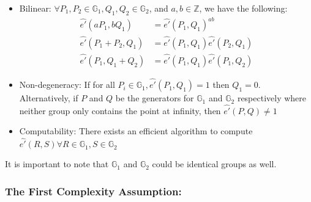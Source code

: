 \begin{itemize}
 \item Bilinear: $\forall P_1,P_2 \in \mathbb{G}_1, Q_1,Q_2\in\mathbb{G}_2$, and $a,b \in \mathbb{Z}$, we have the following:
 \begin{eqnarray}
   \hat{e'}(aP_1,bQ_1) &= \hat{e'}(P_1,Q_1)^{ab}\nonumber\\
   \hat{e'}(P_1+P_2,Q_1) &= \hat{e'}(P_1,Q_1)\hat{e'}(P_2,Q_1)\nonumber\\
   \hat{e'}(P_1,Q_1+Q_2) &= \hat{e'}(P_1,Q_1)\hat{e'}(P_1,Q_2)\nonumber
 \end{eqnarray}
 \item Non-degeneracy: If for all $P_i \in \mathbb{G}_1, \hat{e'}(P_1,Q_1)=1$ then $Q_1=\mathcal{0}$. Alternatively, if $P$ and $Q$ be the generators for $\mathbb{G}_1$ and $\mathbb{G}_2$ respectively where neither group only contains the point at infinity, then $\hat{e'}(P,Q)\neq1$ 
 \item Computability: There exists an efficient algorithm to compute $\hat{e'}(R,S)\forall R \in \mathbb{G}_1, S\in\mathbb{G}_2$
\end{itemize}

It is important to note that $\mathbb{G}_1$ and $\mathbb{G}_2$ could be identical groups as well.

\subsubsection{The First Complexity Assumption:}
\label{subsubsec:asm_1}

